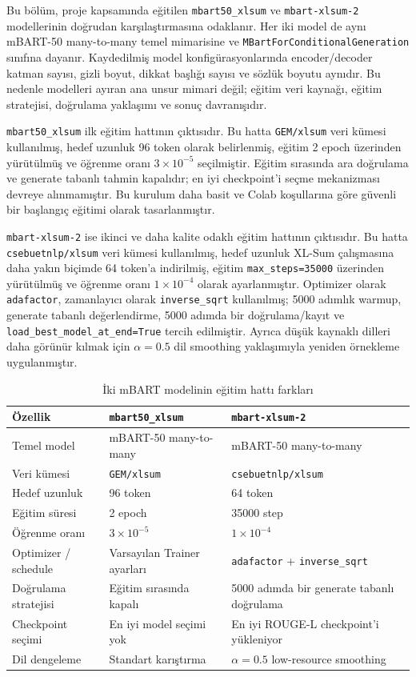 \documentclass[12pt,a4paper]{article}
\begin{document}
Bu bölüm, proje kapsamında eğitilen \texttt{mbart50\_xlsum} ve \texttt{mbart-xlsum-2} modellerinin doğrudan karşılaştırmasına odaklanır. Her iki model de aynı mBART-50 many-to-many temel mimarisine ve \texttt{MBartForConditionalGeneration} sınıfına dayanır. Kaydedilmiş model konfigürasyonlarında encoder/decoder katman sayısı, gizli boyut, dikkat başlığı sayısı ve sözlük boyutu aynıdır. Bu nedenle modelleri ayıran ana unsur mimari değil; eğitim veri kaynağı, eğitim stratejisi, doğrulama yaklaşımı ve sonuç davranışıdır.

\texttt{mbart50\_xlsum} ilk eğitim hattının çıktısıdır. Bu hatta \texttt{GEM/xlsum} veri kümesi kullanılmış, hedef uzunluk 96 token olarak belirlenmiş, eğitim 2 epoch üzerinden yürütülmüş ve öğrenme oranı $3 \times 10^{-5}$ seçilmiştir. Eğitim sırasında ara doğrulama ve generate tabanlı tahmin kapalıdır; en iyi checkpoint'i seçme mekanizması devreye alınmamıştır. Bu kurulum daha basit ve Colab koşullarına göre güvenli bir başlangıç eğitimi olarak tasarlanmıştır.

\texttt{mbart-xlsum-2} ise ikinci ve daha kalite odaklı eğitim hattının çıktısıdır. Bu hatta \texttt{csebuetnlp/xlsum} veri kümesi kullanılmış, hedef uzunluk XL-Sum çalışmasına daha yakın biçimde 64 token'a indirilmiş, eğitim \texttt{max\_steps=35000} üzerinden yürütülmüş ve öğrenme oranı $1 \times 10^{-4}$ olarak ayarlanmıştır. Optimizer olarak \texttt{adafactor}, zamanlayıcı olarak \texttt{inverse\_sqrt} kullanılmış; 5000 adımlık warmup, generate tabanlı değerlendirme, 5000 adımda bir doğrulama/kayıt ve \texttt{load\_best\_model\_at\_end=True} tercih edilmiştir. Ayrıca düşük kaynaklı dilleri daha görünür kılmak için $\alpha=0.5$ dil smoothing yaklaşımıyla yeniden örnekleme uygulanmıştır.

\begin{table}[H]
\centering
\caption{İki mBART modelinin eğitim hattı farkları}
\label{tab:mbart-training-comparison}
\begin{tabular}{p{4.2cm}p{5.1cm}p{5.1cm}}
\toprule
Özellik & \texttt{mbart50\_xlsum} & \texttt{mbart-xlsum-2} \\
\midrule
Temel model & mBART-50 many-to-many & mBART-50 many-to-many \\
Veri kümesi & \texttt{GEM/xlsum} & \texttt{csebuetnlp/xlsum} \\
Hedef uzunluk & 96 token & 64 token \\
Eğitim süresi & 2 epoch & 35000 step \\
Öğrenme oranı & $3 \times 10^{-5}$ & $1 \times 10^{-4}$ \\
Optimizer / schedule & Varsayılan Trainer ayarları & \texttt{adafactor} + \texttt{inverse\_sqrt} \\
Doğrulama stratejisi & Eğitim sırasında kapalı & 5000 adımda bir generate tabanlı doğrulama \\
Checkpoint seçimi & En iyi model seçimi yok & En iyi ROUGE-L checkpoint'i yükleniyor \\
Dil dengeleme & Standart karıştırma & $\alpha=0.5$ low-resource smoothing \\
\bottomrule
\end{tabular}
\end{table}
\end{document}
